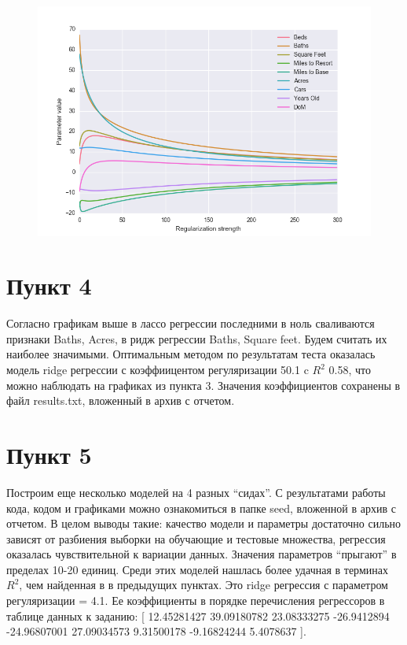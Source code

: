 \documentclass[a4paper, 12pt, oneside]{scrartcl}
\numberwithin{equation}{section}
\numberwithin{table}{section}
\numberwithin{figure}{section}
\begin{document}
\begin{figure}[H]
    \centering
    \includegraphics[width=\linewidth]{Ridge_params.png}
\end{figure}

\newpage
\section*{Пункт 4}
Согласно графикам выше в лассо регрессии последними в ноль сваливаются признаки Baths, Acres, в ридж регрессии Baths, Square feet. Будем считать их 
наиболее значимыми. Оптимальным методом по результатам теста оказалась модель ridge регрессии с коэффиицентом регуляризации 50.1 c $ R^2 $ 
0.58, что можно наблюдать на графиках из пункта 3. Значения коэффициентов сохранены в файл results.txt, вложенный в архив с отчетом. 

\section*{Пункт 5}
Построим еще несколько моделей на 4 разных “сидах”. С результатами работы кода, кодом
и графиками можно ознакомиться в папке seed, вложенной в архив с отчетом. В целом выводы 
такие: качество модели и параметры достаточно сильно зависят от разбиения выборки на 
обучающие и тестовые множества, регрессия оказалась чувствительной к вариации данных. 
Значения параметров “прыгают” в пределах 10-20 единиц. Среди 
этих моделей нашлась более удачная в терминах $ R^2 $, 
чем найденная в в предыдущих пунктах. Это ridge регрессия с параметром регуляризации = 4.1.
Ее коэффициенты в порядке перечисления регрессоров в таблице данных к заданию: 
[ 12.45281427  39.09180782  23.08333275 -26.9412894  -24.96807001
27.09034573   9.31500178  -9.16824244   5.4078637 ].
\end{document}
